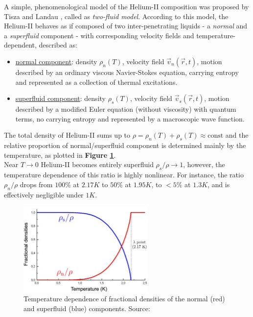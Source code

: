 	A simple, phenomenological model of the Helium-II composition was proposed by Tisza \cite{tisza} and Landau \cite{landau}, called as \textit{two-fluid model}. According to this model, the Helium-II behaves as if composed of two inter-penetrating liquids - a \textit{normal} and a \textit{superfluid} component - with corresponding velocity fields and temperature-dependent, described as:

	\begin{itemize}
		\item \underline{normal component}: density $\rho_n (T)$, velocity field $\vec{v}_n (\vec{r}, t)$, motion described by an ordinary viscous Navier-Stokes equation, carrying entropy and represented as a collection of thermal excitations.
		\item \underline{superfluid component}: density $\rho_s (T)$, velocity field $\vec{v}_s(\vec{r}, t)$, motion described by a modified Euler equation (without viscosity) with quantum terms, no carrying entropy and represented by a macroscopic wave function.
	\end{itemize}

	The total density of Helium-II sums up to $\rho = \rho_n(T) + \rho_s(T) \approx \text{const}$ and the relative proportion of normal/superfluid component is determined mainly by the temperature, as plotted in \textbf{Figure \ref{densities}}.\\
	Near $T \rightarrow 0$ Helium-II becomes entirely superfluid $\rho_s/\rho \rightarrow 1$, however, the temperature dependence of this ratio is highly nonlinear. For instance, the ratio $\rho_n/\rho$ drops from $100\%$ at $2.17\unit{K}$ to $50\%$ at $1.95\unit{K}$, to $<5\%$ at $1.3\unit{K}$, and is effectively negligible under $1\unit{K}$.

	\begin{figure}[h]
		\centering
		\includegraphics[width=0.6\textwidth]{graphics/theory/densities}
		\caption{Temperature dependence of fractional densities of the normal (red) and superfluid (blue) components. Source:\cite{svoc2016}}
		\label{densities}
	\end{figure}

